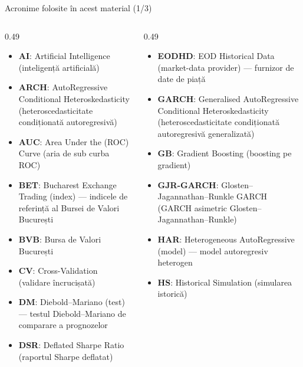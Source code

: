 
{
\begin{frame}[noframenumbering]
    \titlepage
\end{frame}
}
\begin{frame}{Acronime folosite în acest material (1/3)}
\begin{columns}[T]
\begin{column}{0.49\textwidth}
\begin{itemize}\setlength{\itemsep}{0pt}
    \item \textbf{AI}: Artificial Intelligence (inteligență artificială)
    \item \textbf{ARCH}: AutoRegressive Conditional Heteroskedasticity (heteroscedasticitate condiționată autoregresivă)
    \item \textbf{AUC}: Area Under the (ROC) Curve (aria de sub curba ROC)
    \item \textbf{BET}: Bucharest Exchange Trading (index) — indicele de referință al Bursei de Valori București
    \item \textbf{BVB}: Bursa de Valori București
    \item \textbf{CV}: Cross-Validation (validare încrucișată)
    \item \textbf{DM}: Diebold–Mariano (test) — testul Diebold–Mariano de comparare a prognozelor
    \item \textbf{DSR}: Deflated Sharpe Ratio (raportul Sharpe deflatat)
\end{itemize}
\end{column}
\begin{column}{0.49\textwidth}
\begin{itemize}\setlength{\itemsep}{0pt}
    \item \textbf{EODHD}: EOD Historical Data (market-data provider) — furnizor de date de piață
    \item \textbf{GARCH}: Generalised AutoRegressive Conditional Heteroskedasticity (heteroscedasticitate condiționată autoregresivă generalizată)
    \item \textbf{GB}: Gradient Boosting (boosting pe gradient)
    \item \textbf{GJR-GARCH}: Glosten–Jagannathan–Runkle GARCH (GARCH asimetric Glosten–Jagannathan–Runkle)
    \item \textbf{HAR}: Heterogeneous AutoRegressive (model) — model autoregresiv heterogen
    \item \textbf{HS}: Historical Simulation (simularea istorică)
\end{itemize}
\end{column}
\end{columns}
\end{frame}
